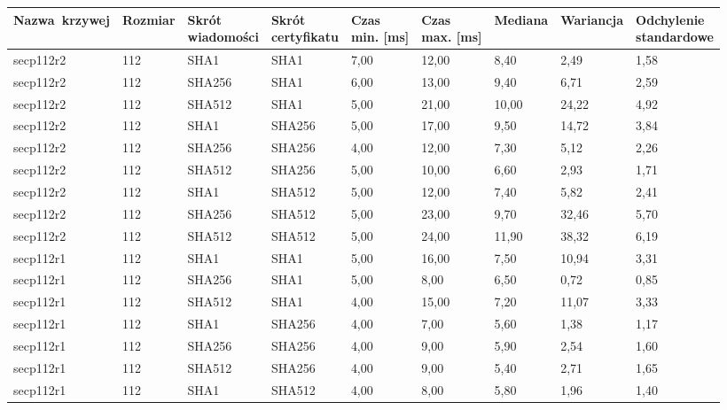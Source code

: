 \begin{longtable}{| l | l | l | l | l |l |l |l |l |}
\hline
\parbox[t]{25mm}{\centering Nazwa\ krzywej} & \parbox[t]{10mm}{\centering Rozmiar} & \parbox[t]{15mm}{\centering Skrót\\ wiadomości} & \parbox[t]{2cm}{\centering Skrót\\ certyfikatu} &  \parbox[t]{10mm}{\centering Czas\\  min. [ms]} & \parbox[t]{10mm}{\centering Czas\\ max. [ms]}  & \parbox[t]{2cm}{\centering Mediana} & \parbox[t]{2cm}{\centering Wariancja} & \parbox[t]{30mm}{\centering Odchylenie\\ standardowe} \\ \hline 
\endhead
secp112r2 & 112 & SHA1 & SHA1 & 7,00 & 12,00 & 8,40 & 2,49 & 1,58 \\ \hline 
secp112r2 & 112 & SHA256 & SHA1 & 6,00 & 13,00 & 9,40 & 6,71 & 2,59 \\ \hline 
secp112r2 & 112 & SHA512 & SHA1 & 5,00 & 21,00 & 10,00 & 24,22 & 4,92 \\ \hline 
secp112r2 & 112 & SHA1 & SHA256 & 5,00 & 17,00 & 9,50 & 14,72 & 3,84 \\ \hline 
secp112r2 & 112 & SHA256 & SHA256 & 4,00 & 12,00 & 7,30 & 5,12 & 2,26 \\ \hline 
secp112r2 & 112 & SHA512 & SHA256 & 5,00 & 10,00 & 6,60 & 2,93 & 1,71 \\ \hline 
secp112r2 & 112 & SHA1 & SHA512 & 5,00 & 12,00 & 7,40 & 5,82 & 2,41 \\ \hline 
secp112r2 & 112 & SHA256 & SHA512 & 5,00 & 23,00 & 9,70 & 32,46 & 5,70 \\ \hline 
secp112r2 & 112 & SHA512 & SHA512 & 5,00 & 24,00 & 11,90 & 38,32 & 6,19 \\ \hline 
secp112r1 & 112 & SHA1 & SHA1 & 5,00 & 16,00 & 7,50 & 10,94 & 3,31 \\ \hline 
secp112r1 & 112 & SHA256 & SHA1 & 5,00 & 8,00 & 6,50 & 0,72 & 0,85 \\ \hline 
secp112r1 & 112 & SHA512 & SHA1 & 4,00 & 15,00 & 7,20 & 11,07 & 3,33 \\ \hline 
secp112r1 & 112 & SHA1 & SHA256 & 4,00 & 7,00 & 5,60 & 1,38 & 1,17 \\ \hline 
secp112r1 & 112 & SHA256 & SHA256 & 4,00 & 9,00 & 5,90 & 2,54 & 1,60 \\ \hline 
secp112r1 & 112 & SHA512 & SHA256 & 4,00 & 9,00 & 5,40 & 2,71 & 1,65 \\ \hline 
secp112r1 & 112 & SHA1 & SHA512 & 4,00 & 8,00 & 5,80 & 1,96 & 1,40 \\ \hline 

\end{longtable}
